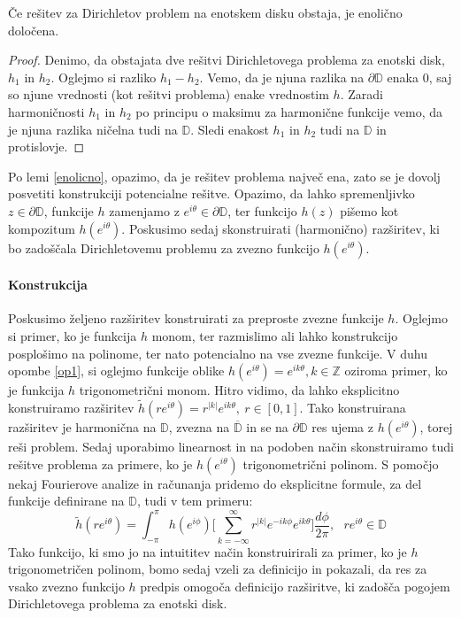 \documentclass[mat1]{fmfdelo}
\begin{document}
    \begin{lema}
        \label{enolicno}
        Če rešitev za Dirichletov problem na enotskem disku obstaja, je enolično določena.
    \end{lema}
    \begin{proof}
        Denimo, da obstajata dve rešitvi Dirichletovega problema za enotski disk, $h_1$ in $h_2$.
        Oglejmo si razliko $h_1 - h_2$. Vemo, da je njuna razlika na $\partial \mathbb{D}$ enaka $0$, saj so njune vrednosti (kot rešitvi problema) enake vrednostim $h$. 
        Zaradi harmoničnosti $h_1$ in $h_2$ po principu o maksimu za harmonične funkcije vemo, da je njuna razlika ničelna tudi na $\mathbb{D}$. Sledi enakost $h_1$ in $h_2$ tudi na $\mathbb{D}$ in protislovje. 
    \end{proof}

    \begin{opomba}
        \label{op1}
        Po lemi \ref{enolicno}, opazimo, da je rešitev problema največ ena, zato se je dovolj posvetiti konstrukciji potencialne rešitve. 
        Opazimo, da lahko spremenljivko $z \in \partial \mathbb{D}$, funkcije $h$ zamenjamo z $e^{i \theta} \in \partial \mathbb{D}$, ter funkcijo $h(z)$ pišemo kot kompozitum $h(e^{i \theta})$.
        Poskusimo sedaj skonstruirati (harmonično) razširitev, ki bo zadoščala Dirichletovemu problemu za zvezno funkcijo $h(e^{i \theta})$.
    \end{opomba}

    \paragraph[short]{\textbf{Konstrukcija}}
    Poskusimo željeno razširitev konstruirati za preproste zvezne funkcije $h$. Oglejmo si primer, ko je funkcija $h$ monom, ter razmislimo ali lahko konstrukcijo posplošimo na polinome, ter nato potencialno na vse zvezne funkcije. 
    V duhu opombe \ref{op1}, si oglejmo funkcije oblike $h(e^{i \theta}) = e^{i k \theta}, k \in \mathbb{Z}$ oziroma primer, ko je funkcija $h$ trigonometrični monom. Hitro vidimo, da lahko eksplicitno konstruiramo razširitev $\widetilde{h}(r e^{i \theta}) = r^{|k|}e^{i k \theta},~r \in [0, 1]$. 
    Tako konstruirana razširitev je harmonična na $\mathbb{D}$, zvezna na $\overline{\mathbb{D}}$ in se na $\partial \mathbb{D}$ res ujema z $h(e^{i \theta})$, torej reši problem. Sedaj uporabimo linearnost in na podoben način skonstruiramo tudi rešitve problema za primere, ko je $h(e^{i \theta})$ trigonometrični polinom. 
    S pomočjo nekaj Fourierove analize in računanja pridemo do eksplicitne formule, za del funkcije definirane na $\mathbb{D}$, tudi v tem primeru:
    $$
        \widetilde{h}(r e^{i \theta}) = \int_{-\pi}^{\pi}{h(e^{i \phi}) \bigg[\sum_{k = - \infty}^{\infty} r^{|k|} e^{- i k \phi} e^{i k \theta}} \bigg]\frac{d \phi}{2 \pi}, ~~~ r e^{i\theta} \in \mathbb{D}
    $$
    Tako funkcijo, ki smo jo na intuititev način konstruirirali za primer, ko je $h$ trigonometričen polinom, bomo sedaj vzeli za definicijo in pokazali, da res za vsako zvezno funkcijo $h$ predpis omogoča definicijo razširitve, ki zadošča pogojem Dirichletovega problema za enotski disk. 
\end{document}
